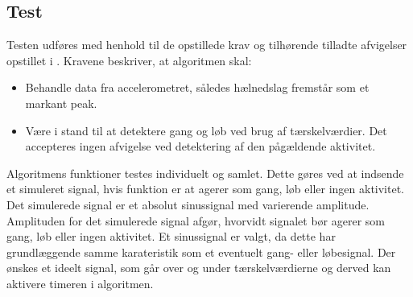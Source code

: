 \subsection{Test}
Testen udføres med henhold til de opstillede krav og tilhørende tilladte afvigelser opstillet i . Kravene beskriver, at algoritmen skal:
\begin{itemize}
	\item Behandle data fra accelerometret, således hælnedslag fremstår som et markant peak.
	\item Være i stand til at detektere gang og løb ved brug af tærskelværdier. Det accepteres ingen afvigelse ved detektering af den pågældende aktivitet.
\end{itemize}
Algoritmens funktioner testes individuelt og samlet. Dette gøres ved at indsende et simuleret signal, hvis funktion er at agerer som gang, løb eller ingen aktivitet. Det simulerede signal er et absolut sinussignal med varierende amplitude. Amplituden for det simulerede signal afgør, hvorvidt signalet bør agerer som gang, løb eller ingen aktivitet. Et sinussignal er valgt, da dette har grundlæggende samme karateristik som et eventuelt gang- eller løbesignal. Der ønskes et ideelt signal, som går over og under tærskelværdierne og derved kan aktivere timeren i algoritmen.

